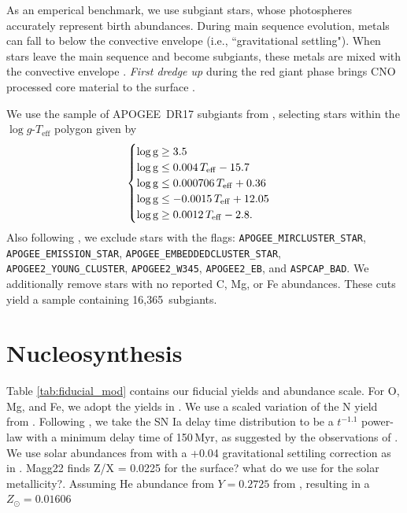 \documentclass[fleqn,
usenatbib]{mnras}
\newcommand{\citetjack}{\citet{jack}}
\newcommand{\nsubgiants}{16,365}
\newcommand{\apogee}{APOGEE}
\newcommand{\ia}{SN Ia}
\newcommand{\dbadd}[1]{{\color{Thistle} #1}}
\begin{document}
As an emperical benchmark, we use subgiant stars, whose photospheres accurately represent birth abundances. 
During main sequence evolution, metals can fall to below the convective envelope (i.e., ``gravitational settling").
When stars leave the main sequence and become subgiants, these metals are mixed with the convective envelope \citep[]{gratton+00, souto19}. 
 \textit{First dredge up} during the red giant phase brings CNO processed core material to the surface \citet{iben67, KL14}.
 
We use the sample of \apogee\ DR17 subgiants from \citetjack, selecting stars within the $\log g$-$T_\text{eff}$ polygon given by
 \begin{equation}
    \begin{cases} \label{eq:subgiant_selection}
        \log \text{g} \geq 3.5 \\
        \log \text{g} \leq 0.004\,T_{\rm eff} - 15.7 \\
        \log \text{g} \leq 0.000706\,T_{\rm eff} + 0.36 \\
        \log \text{g} \leq -0.0015\,T_{\rm eff} + 12.05 \\
        \log \text{g} \geq 0.0012\,T_{\rm eff} - 2.8. \\
    \end{cases}
\end{equation}
Also following \citet{jack}, we exclude stars with the flags:
        \verb|APOGEE_MIRCLUSTER_STAR|,
        \verb|APOGEE_EMISSION_STAR|,
        \verb|APOGEE_EMBEDDEDCLUSTER_STAR|,
        \verb|APOGEE2_YOUNG_CLUSTER|,
            \verb|APOGEE2_W345|,
        \verb|APOGEE2_EB|, and
        \verb|ASPCAP_BAD|.
We additionally remove stars with no reported C, Mg, or Fe abundances. These cuts yield a sample containing \nsubgiants\ subgiants.




\section{Nucleosynthesis}\label{sec:nucleosynthesis}


Table \ref{tab:fiducial_mod} contains our fiducial yields and abundance scale. 
For O, Mg, and Fe, we adopt the yields in \citet{david_fe}. We use a scaled variation of the N yield from \citet{james+23}. 
Following \citet{james+21, james+23}, we take the \ia{} delay time distribution to be a $t^{-1.1}$ power-law with a minimum delay time of 150\,Myr, as suggested by the observations of \citet{maoz+12}. We use solar abundances from \citet{magg+22} with a +0.04 gravitational settiling correction as in \citet{david_fe}. \dbadd{Magg22 finds Z/X = 0.0225 for the surface? what do we use for the solar metallicity?}. Assuming He abundance from $Y=0.2725$ from \citet{AAG2021}, resulting in a $Z_\odot=0.01606$
\end{document}
